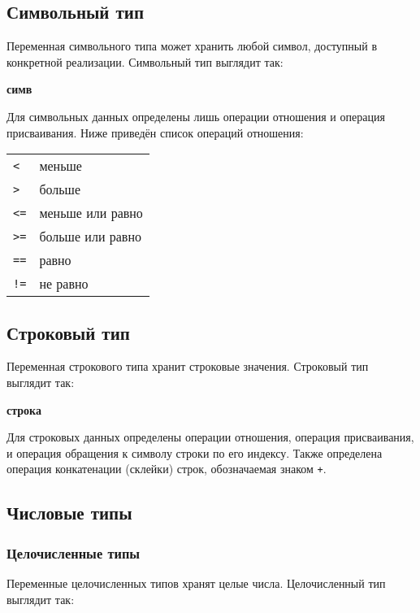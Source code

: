 \documentclass[10pt]{report}
\begin{document}
\subsection{Символьный тип}
Переменная символьного типа может хранить любой символ, доступный в конкретной реализации. Символьный тип выглядит так:
\begin{center}
	\noindent\textbf{симв}
\end{center}

Для символьных данных определены лишь операции отношения и операция присваивания. Ниже приведён список операций отношения:

\begin{tabular}{ll}
	\texttt{<}         & меньше                                        \\
	\texttt{>}         & больше                                        \\
	\texttt{<=}        & меньше или равно                              \\
	\texttt{>=}        & больше или равно                              \\
	\texttt{==}        & равно                                         \\
	\texttt{!=}        & не равно                                      \\
\end{tabular}   
   
\subsection{Строковый тип}
Переменная строкового типа хранит строковые значения. Строковый тип выглядит так:
\begin{center}
	\noindent\textbf{строка}
\end{center}

Для строковых данных определены операции отношения, операция присваивания, и операция обращения к символу строки по его индексу. Также определена операция конкатенации (склейки) строк, обозначаемая знаком \glqq\texttt{+}\grqq.

\subsection{Числовые типы}
\subsubsection{Целочисленные типы}          
Переменные целочисленных типов хранят целые числа. Целочисленный тип выглядит так:
\end{document}
